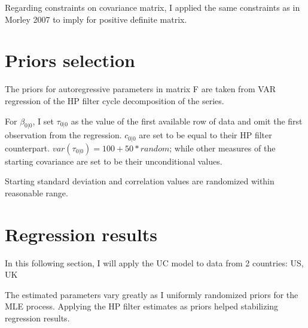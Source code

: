 \documentclass[fleqn]{article}
\begin{document}
\begin{outline}[enumerate]
Regarding constraints on covariance matrix, I applied the same constraints as in Morley 2007 to imply for positive definite matrix.


\section{Priors selection}

The priors for autoregressive parameters in matrix F are taken from VAR regression of the HP filter cycle decomposition of the series.

For $\beta_{0|0}$, I set $\tau_{0|0}$ as the value of the first available row of data and omit the first observation from the regression. $c_{0|0}$ are set to be equal to their HP filter counterpart. $var(\tau_{0|0}) =100+50*random$; while other measures of the starting covariance are set to be their unconditional values.

Starting standard deviation and correlation values are randomized within reasonable range.

 

\section{Regression results}

In this following section, I will apply the UC model to data from 2 countries: US, UK %

The estimated parameters vary greatly as I uniformly randomized priors for the MLE process. Applying the HP filter estimates as priors helped stabilizing regression results.

\pagebreak



\end{outline}
\end{document}
